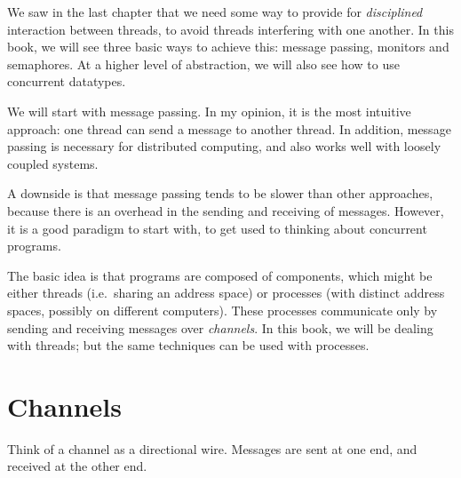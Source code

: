 
We saw in the last chapter that we need some way to provide for
\emph{disciplined} interaction between threads, to avoid threads interfering
with one another.  In this book, we will see three basic ways to achieve this:
message passing, monitors and semaphores.  At a higher level of abstraction,
we will also see how to use concurrent datatypes.

We will start with message passing.  In my opinion, it is the most intuitive
approach: one thread can send a message to another thread.  
In addition, message passing is  necessary for distributed computing, and also
works well with loosely coupled systems.  

A downside is that message passing tends to be slower than other approaches,
because there is an overhead in the sending and receiving of messages.
However, it is a good paradigm to start with, to get used to thinking about
concurrent programs.

The basic idea is that programs are composed of components, which might be
either threads (i.e.~sharing an address space) or processes (with distinct
address spaces, possibly on different computers).  These processes communicate
only by sending and receiving messages over \emph{channels}.  In this book, we
will be dealing with threads; but the same techniques can be used with
processes. 


\section{Channels}

Think of a channel as a directional wire.  Messages are sent at one end, and
received at the other end. 



